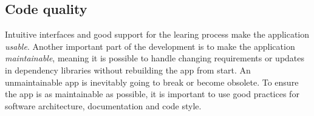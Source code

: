 \subsection{Code quality}

Intuitive interfaces and good support for the learing process make the application \textit{usable}. Another important part of the development is to make the application \textit{maintainable}, meaning it is possible to handle changing requirements or updates in dependency libraries without rebuilding the app from start. An unmaintainable app is inevitably going to break or become obsolete. To ensure the app is as maintainable as possible, it is important to use good practices for software architecture, documentation and code style.
